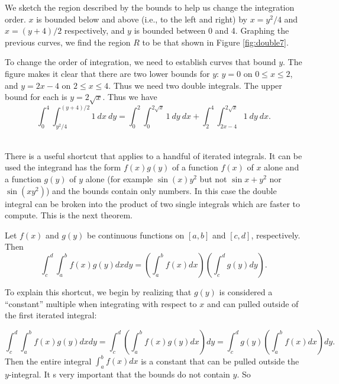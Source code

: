 {We sketch the region described by the bounds to help us change the integration order. $x$ is bounded below and above (i.e., to the left and right) by $x=y^2/4$ and $x=(y+4)/2$ respectively, and $y$ is bounded between 0 and 4. Graphing the previous curves, we find the region $R$ to be that shown in Figure \ref{fig:double7}. 

To change the order of integration, we need to establish curves that bound $y$. The figure makes it clear that there are two lower bounds for $y$: $y=0$ on $0\leq x\leq 2$, and $y=2x-4$ on $2\leq x\leq 4$. Thus we need two double integrals. The upper bound for each is $y=2\sqrt{x}$. Thus we have
$$\int_0^4\int_{y^2/4}^{(y+4)/2}1\ dx\ dy = \int_0^2\int_0^{2\sqrt{x}} 1\ dy\ dx + \int_2^4\int_{2x-4}^{2\sqrt{x}}1\ dy\ dx.$$
}\\

There is a useful shortcut that applies to a handful of iterated integrals.  It can be used the integrand has the form $f(x)g(y)$ of a function $f(x)$ of $x$ alone and a function $g(y)$ of $y$ alone (for example $\sin(x)y^2$ but not $\sin x + y^2$ nor $\sin\left(xy^2\right)$) and the bounds contain only numbers.  In this case the double integral can be broken into the product of two single integrals which are faster to compute.  This is the next theorem.

{Let $f(x)$ and $g(y)$ be continuous functions on $[a,b]$ and $[c,d]$, respectively.  Then
$$\int_c^d \int_a^b f(x) g(y) dx dy = \left(\int_a^b f(x) dx\right) \left(\int_c^d g(y) dy\right).$$
}

To explain this shortcut, we begin by realizing that $g(y)$ is considered a ``constant'' multiple when integrating with respect to $x$ and can pulled outside of the first iterated integral:

$$\int_c^d \int_a^b f(x) g(y) dx dy = \int_c^d \left( \int_a^b f(x) g(y) dx \right) dy = \int_c^d g(y) \left( \int_a^b f(x) dx \right) dy.$$  Then the entire integral $\int_a^b f(x) dx$ is a constant that can be pulled outside the $y$-integral.  It s very important that the bounds do not contain $y$.  So


